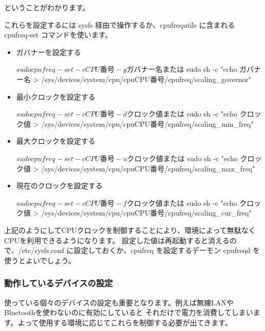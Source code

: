 \documentclass[mingoth,a4paper]{jsarticle}
\begin{document}
ということがわかります。

これらを設定するには sysfs 経由で操作するか、cpufrequtils に含まれる
cpufreq-set コマンドを使います。

\begin{itemize}
\item ガバナーを設定する
  \begin{commandline}
   $ sudo cpufreq-set -c CPU番号 -g ガバナー名
   または
   $ sudo sh -c "echo ガバナー名 > /sys/devices/system/cpu/cpuCPU番号/cpufreq/scaling_governor"
  \end{commandline}

\item 最小クロックを設定する
  \begin{commandline}
   $ sudo cpufreq-set -c CPU番号 -d クロック値
   または
   $ sudo sh -c "echo クロック値 > /sys/devices/system/cpu/cpuCPU番号/cpufreq/scaling_min_freq"
  \end{commandline}

\item 最大クロックを設定する
  \begin{commandline}
   $ sudo cpufreq-set -c CPU番号 -u クロック値
   または
   $ sudo sh -c "echo クロック値 > /sys/devices/system/cpu/cpuCPU番号/cpufreq/scaling_max_freq"
  \end{commandline}

\item 現在のクロックを設定する
  \begin{commandline}
   $ sudo cpufreq-set -c CPU番号 -f クロック値
   または
   $ sudo sh -c "echo クロック値 > /sys/devices/system/cpu/cpuCPU番号/cpufreq/scaling_cur_freq"
  \end{commandline}

\end{itemize}

上記のようにしてCPUクロックを制御することにより、環境によって無駄なくCPUを利用できるようになります。
設定した値は再起動すると消えるので、/etc/sysfs.conf に設定しておくか、cpufreq を設定するデーモン cpufreqd
を使うとよいでしょう。

\subsubsection{動作しているデバイスの設定}

使っている個々のデバイスの設定も重要となります。例えば無線LANやBluetoothを使わないのに有効にしていると
それだけで電力を消費してしまいます。よって使用する環境に応じてこれらを制御する必要が出てきます。
\end{document}
